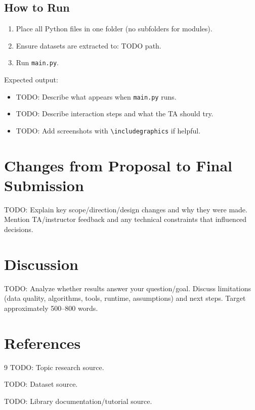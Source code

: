 \documentclass[12pt]{article}
\begin{document}
\subsection{How to Run}
\begin{enumerate}[leftmargin=*]
    \item Place all Python files in one folder (no subfolders for modules).
    \item Ensure datasets are extracted to: TODO path.
    \item Run \texttt{main.py}.
\end{enumerate}

Expected output:
\begin{itemize}[leftmargin=*]
    \item TODO: Describe what appears when \texttt{main.py} runs.
    \item TODO: Describe interaction steps and what the TA should try.
    \item TODO: Add screenshots with \texttt{\textbackslash includegraphics} if helpful.
\end{itemize}

\section{Changes from Proposal to Final Submission}
TODO: Explain key scope/direction/design changes and why they were made.
Mention TA/instructor feedback and any technical constraints that influenced decisions.

\section{Discussion}
TODO: Analyze whether results answer your question/goal.
Discuss limitations (data quality, algorithms, tools, runtime, assumptions) and next steps.
Target approximately 500--800 words.

\section{References}
\begin{thebibliography}{9}
TODO: Topic research source.

TODO: Dataset source.

TODO: Library documentation/tutorial source.
\end{thebibliography}
\end{document}
